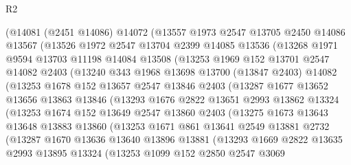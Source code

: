 \begin{lexlean}{R2}
\begin{coremodule}
    (@14081
      (@2451 @14086)
      @14072
      (@13557
        @1973
        @2547
        @13705
        @2450
        @14086
        @13567
        (@13526
          @1972
          @2547
          @13704
          @2399
          @14085
          @13536
          (@13268
            @1971
            @9594
            @13703
            @11198
            @14084
            @13508
            (@13253
              @1969
              @152
              @13701
              @2547
              @14082
              @2403
              (@13240
                @343
                @1968
                @13698
                @13700
                (@13847 @2403)
                @14082
                (@13253
                  @1678
                  @152
                  @13657
                  @2547
                  @13846
                  @2403
                  (@13287
                    @1677
                    @13652
                    @13656
                    @13863
                    @13846
                    (@13293
                      @1676
                      @2822
                      @13651
                      @2993
                      @13862
                      @13324
                      (@13253
                        @1674
                        @152
                        @13649
                        @2547
                        @13860
                        @2403
                        (@13275
                          @1673
                          @13643
                          @13648
                          @13883
                          @13860
                          (@13253
                            @1671
                            @861
                            @13641
                            @2549
                            @13881
                            @2732
                            (@13287
                              @1670
                              @13636
                              @13640
                              @13896
                              @13881
                              (@13293
                                @1669
                                @2822
                                @13635
                                @2993
                                @13895
                                @13324
                                (@13253
                                  @1099
                                  @152
                                  @2850
                                  @2547
                                  @3069

\end{coremodule}
\end{lexlean}
